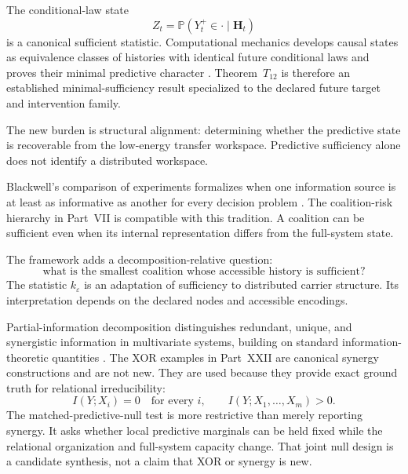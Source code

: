 

The conditional-law state
\[
Z_t=\mathbb P(Y_t^+\in\cdot\mid\mathbf H_t)
\]
is a canonical sufficient statistic. Computational mechanics develops causal
states as equivalence classes of histories with identical future conditional
laws and proves their minimal predictive character
\cite{ShaliziCrutchfield2001}. Theorem~\(T_{12}\) is therefore an established
minimal-sufficiency result specialized to the declared future target and
intervention family.

The new burden is structural alignment: determining whether the predictive
state is recoverable from the low-energy transfer workspace. Predictive
sufficiency alone does not identify a distributed workspace.


Blackwell's comparison of experiments formalizes when one information source
is at least as informative as another for every decision problem
\cite{Blackwell1953}. The coalition-risk hierarchy in Part~VII is compatible
with this tradition. A coalition can be sufficient even when its internal
representation differs from the full-system state.

The framework adds a decomposition-relative question:
\[
\text{what is the smallest coalition whose accessible history is sufficient?}
\]
The statistic \(k_\varepsilon\) is an adaptation of sufficiency to distributed
carrier structure. Its interpretation depends on the declared nodes and
accessible encodings.


Partial-information decomposition distinguishes redundant, unique, and
synergistic information in multivariate systems, building on standard
information-theoretic quantities \cite{CoverThomas2006,WilliamsBeer2010}. The
XOR examples in Part~XXII are canonical synergy constructions and are not new.
They are used because they provide exact ground truth for relational
irreducibility:
\[
I(Y;X_i)=0
\quad\text{for every }i,
\qquad
I(Y;X_1,\ldots,X_m)>0.
\]
The matched-predictive-null test is more restrictive than merely
reporting synergy. It asks whether local predictive marginals can be held
fixed while the relational organization and full-system capacity change.
That joint null design is a candidate synthesis, not a claim that XOR or
synergy is new.

